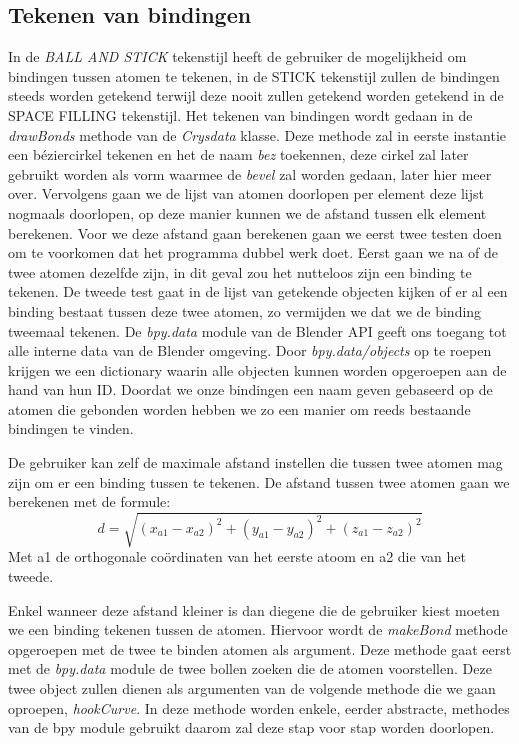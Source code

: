 \subsection{Tekenen van bindingen}    

In de \textit{BALL AND STICK} tekenstijl heeft de gebruiker de mogelijkheid om bindingen tussen atomen te tekenen, in de {STICK} tekenstijl zullen de bindingen steeds worden getekend terwijl deze nooit zullen getekend worden getekend in de {SPACE FILLING} tekenstijl. Het tekenen van bindingen wordt gedaan in de \textit{drawBonds} methode van de \textit{Crysdata} klasse. Deze methode zal in eerste instantie een béziercirkel tekenen en het de naam \textit{bez} toekennen, deze cirkel zal later gebruikt worden als vorm waarmee de \textit{bevel} zal worden gedaan, later hier meer over. Vervolgens gaan we de lijst van atomen doorlopen per element deze lijst nogmaals doorlopen, op deze manier kunnen we de afstand tussen elk element berekenen. Voor we deze afstand gaan berekenen gaan we eerst twee testen doen om te voorkomen dat het programma dubbel werk doet. Eerst gaan we na of de twee atomen dezelfde zijn, in dit geval zou het nutteloos zijn een binding te tekenen. De tweede test gaat in de lijst van getekende objecten kijken of er al een binding bestaat tussen deze twee atomen, zo vermijden we dat we de binding tweemaal tekenen. De \textit{bpy.data} module van de Blender API geeft ons toegang tot alle interne data van de Blender omgeving. Door \textit{bpy.data/objects} op te roepen krijgen we een dictionary waarin alle objecten kunnen worden opgeroepen aan de hand van hun ID. Doordat we onze bindingen een naam geven gebaseerd op de atomen die gebonden worden hebben we zo een manier om reeds bestaande bindingen te vinden.
\par
De gebruiker kan zelf de maximale afstand instellen die tussen twee atomen mag zijn om er een binding tussen te tekenen. De afstand tussen twee atomen gaan we berekenen met de formule:
\[ d = \sqrt{(x_{a1}-x_{a2})^2+(y_{a1}-y_{a2})^2+(z_{a1}-z_{a2})^2}\]   
Met a1 de orthogonale coördinaten van het eerste atoom en a2 die van het tweede.
\par
Enkel wanneer deze afstand kleiner is dan diegene die de gebruiker kiest moeten we een binding tekenen tussen de atomen. Hiervoor wordt de \textit{makeBond} methode opgeroepen met de twee te binden atomen als argument. Deze methode gaat eerst met de \textit{bpy.data} module de twee bollen zoeken die de atomen voorstellen. Deze twee object zullen dienen als argumenten van de volgende methode die we gaan oproepen, \textit{hookCurve}. In deze methode worden enkele, eerder abstracte, methodes van de bpy module gebruikt daarom zal deze stap voor stap worden doorlopen.

